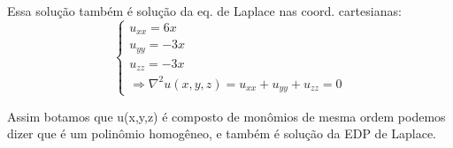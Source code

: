 Essa solução também é solução da eq. de Laplace nas coord. cartesianas:
\begin{equation*}
    \begin{cases}
        u_{xx} = 6x\\
        u_{yy} = -3x\\
        u_{zz} = -3x\\
        \Rightarrow \nabla^2 u(x,y,z) = u_{xx} + u_{yy} + u_{zz} = 0
    \end{cases}
\end{equation*}

Assim botamos que u(x,y,z) é composto de monômios de mesma ordem podemos dizer que é um polinômio homogêneo, e também é solução da EDP de Laplace.


